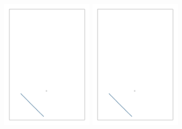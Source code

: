 \documentclass[12pt]{jsarticle}
\begin{document}
  \begin{figure}[H]
    \begin{center}
    \begin{minipage}[b]{0.45\linewidth}
      \centering
      \includegraphics[width=4.5cm]{images/diag_car_init.png}
    \end{minipage}
    \begin{minipage}[b]{0.45\linewidth}
      \centering
      \includegraphics[width=4.5cm]{images/diag_car_init.png}
    \end{minipage}


\end{center}
\end{figure}
\end{document}
